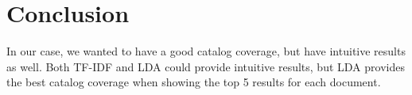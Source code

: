 \chapter{Conclusion} \label{chp:chapter4}

In our case, we wanted to have a good catalog coverage, but have intuitive results as well. Both TF-IDF and LDA could provide intuitive results, but LDA provides the best catalog coverage when showing the top 5 results for each document.
